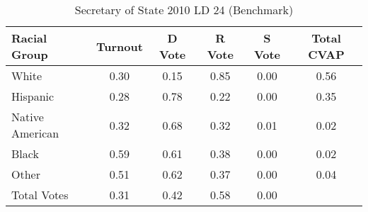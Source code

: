 \begin{table}[htb]
\begin{center}
\caption{Secretary of State 2010 LD 24 (Benchmark)}
\label{sos10_cvap_ld_24_benchmark}
\begin{tabular}{lccccc}
  \hline
Racial Group & Turnout & D Vote & R Vote & S Vote & Total CVAP \\ 
  \hline
White & 0.30 & 0.15 & 0.85 & 0.00 & 0.56 \\ 
  Hispanic & 0.28 & 0.78 & 0.22 & 0.00 & 0.35 \\ 
  Native American & 0.32 & 0.68 & 0.32 & 0.01 & 0.02 \\ 
  Black & 0.59 & 0.61 & 0.38 & 0.00 & 0.02 \\ 
  Other & 0.51 & 0.62 & 0.37 & 0.00 & 0.04 \\ 
  Total Votes & 0.31 & 0.42 & 0.58 & 0.00 &  \\ 
   \hline
\end{tabular}
\end{center}
\end{table}
